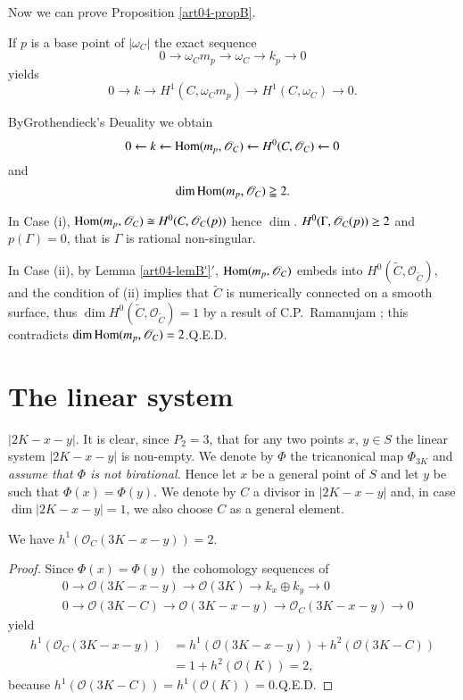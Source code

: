 Now we can prove Proposition \ref{art04-propB}.

If $p$ is a base point of $|\omega_{C}|$ the exact sequence
$$
0\to \omega_{C}m_{p}\to \omega_{C}\to k_{p}\to 0
$$
yields
$$
0\to k\to H^{1}(C,\omega_{C}m_{p})\to H^{1}(C,\omega_{C})\to 0.
$$

By\pageoriginale Grothendieck's Deuality we obtain
$$
0\leftarrow k\leftarrow \operatorname{Hom}(m_{p},\mathscr{O}_{C})\leftarrow
H^{0}(C,\mathscr{O}_{C})\leftarrow 0
$$
and
$$
\dim\operatorname{Hom}(m_{p},\mathscr{O}_{C})\geqq 2.
$$

In Case (i), $\operatorname{Hom}(m_{p},\mathscr{O}_{C})\cong
H^{0}(C,\mathscr{O}_{C}(p))$ hence
$\dim$. $H^{0}(\Gamma,\break\mathscr{O}_{C}(p))\geq 2$ and $p(\Gamma)=0$,
that is $\Gamma$ is rational non-singular.

In Case (ii), by Lemma \ref{art04-lemB'}$'$,
$\operatorname{Hom}(m_{p},\mathscr{O}_{C})$ embeds into\break
$H^{0}(\widetilde{C},\mathscr{O}_{\widetilde{C}})$, and the condition
of (ii) implies that $\widetilde{C}$ is numerically connected on a
smooth surface, thus $\dim
H^{0}(\widetilde{C},\mathscr{O}_{\widetilde{C}})=1$ by a result of
C.P.~Ramanujam \cite{art04-key6}; this contradicts
$\dim \operatorname{Hom}(m_{p},\mathscr{O}_{C})=2$.\hfill Q.E.D.

\section{The linear system}\label{art04-sec3}

$|2K-x-y|$. It is clear, since $P_{2}=3$, that for any two points $x$,
$y\in S$ the linear system $|2K-x-y|$ is non-empty. We denote by
$\Phi$ the tricanonical map $\Phi_{3K}$ and {\em assume that $\Phi$ is
not birational.} Hence let $x$ be a general point of $S$ and let $y$
be such that $\Phi(x)=\Phi(y)$. We denote by $C$ a divisor in
$|2K-x-y|$ and, in case $\dim|2K-x-y|=1$, we also choose $C$ as a
general element.

\begin{lem}\label{art04-lem1}
We have $h^1(\mathscr{O}_{C}(3K-x-y))=2$.
\end{lem}

\begin{proof}
Since $\Phi(x)=\Phi(y)$ the cohomology sequences of
\begin{align*}
& 0\to \mathscr{O}(3K-x-y)\to \mathscr{O}(3K)\to k_{x}\oplus k_{y}\to
0\\
&
0\to \mathscr{O}(3K-C)\to \mathscr{O}(3K-x-y)\to \mathscr{O}_{C}(3K-x-y)\to 0
\end{align*}
yield
\begin{align*}
h^{1}(\mathscr{O}_{C}(3K-x-y)) &=
h^{1}(\mathscr{O}(3K-x-y))+h^{2}(\mathscr{O}(3K-C))\\[3pt]
&= 1+h^{2}(\mathscr{O}(K))=2,
\end{align*}
because $h^1(\mathscr{O}(3K-C))=h^{1}(\mathscr{O}(K))=0$.\hfill Q.E.D.
\end{proof}

